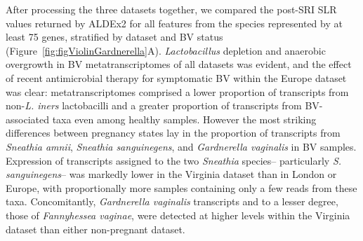 \documentclass[sn-mathphys,Numbered]{sn-jnl}%
\begin{document}
After processing the three datasets together, we compared the post-SRI SLR values returned by ALDEx2 for all features from the species represented by at least 75 genes, stratified by dataset and BV status (Figure~\ref{fig:figViolinGardnerella}A). \textit{Lactobacillus} depletion and anaerobic overgrowth in BV metatranscriptomes of all datasets was evident, and the effect of recent antimicrobial therapy for symptomatic BV within the Europe dataset was clear: metatranscriptomes comprised a lower proportion of transcripts from non-\textit{L. iners} lactobacilli and a greater proportion of transcripts from BV-associated taxa even among healthy samples. However the most striking differences between pregnancy states lay in the proportion of transcripts from \textit{Sneathia amnii}, \textit{Sneathia sanguinegens}, and \textit{Gardnerella vaginalis} in BV samples. Expression of transcripts assigned to the two \textit{Sneathia} species-- particularly \textit{S. sanguinegens}-- was markedly lower in the Virginia dataset than in London or Europe, with proportionally more samples containing only a few reads from these taxa. Concomitantly, \textit{Gardnerella vaginalis} transcripts and to a lesser degree, those of \textit{Fannyhessea vaginae}, were detected at higher levels within the Virginia dataset than either non-pregnant dataset.
\end{document}
